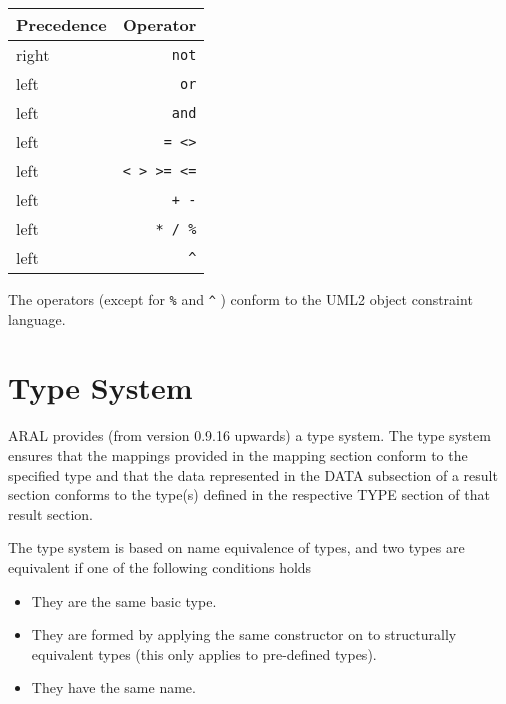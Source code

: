 \vspace{0.3cm}
\begin{tabular}{|l|r|}\hline
Precedence & Operator\\\hline\hline
right & \texttt{not}\\\hline
left & \texttt{or}\\\hline
left & \texttt{and}\\\hline
left & \texttt{= <>}\\\hline
left & \texttt{< > >= <=} \\\hline
left & \texttt{+ -}\\\hline
left & \texttt{* / \%}\\\hline
left & \texttt{\^}\\\hline
\end{tabular}

The operators (except for \texttt{\%} and \texttt{\^} ) conform to the UML2 object constraint language.


\section{Type System}

ARAL provides (from version 0.9.16 upwards) a type system. The type
system ensures that the mappings provided in the mapping section
conform to the specified type and that the data represented in the
DATA subsection of a result section conforms to the type(s) defined in
the respective TYPE section of that result section.

The type system is based on name equivalence of types, and two types are equivalent if one of the following conditions holds

\begin{itemize}
\item They are the same basic type.
\item They are formed by applying the same constructor on to structurally equivalent types (this only applies to pre-defined types).
\item They have the same name.
\end{itemize}

